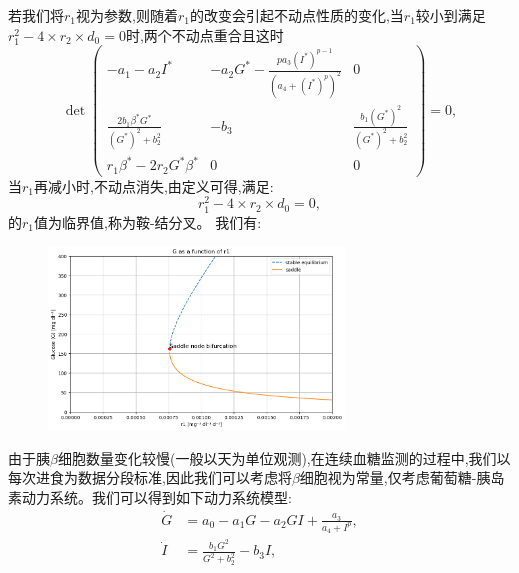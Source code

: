     若我们将$r_1$视为参数,则随着$r_1$的改变会引起不动点性质的变化,当$r_1$较小到满足$r_1^2-4\times r_2\times d_0=0$时,两个不动点重合且这时
    \begin{equation}
        \det \begin{pmatrix}
        -a_1-a_2I^*                            & -a_2G^*-\frac{pa_3(I^*)^{p-1}}{(a_4+(I^*)^p)^2} & 0                                  \\
        \frac{2b_1\beta^*G^*}{(G^*)^2 + b_2^2} & -b_3                                            & \frac{b_1(G^*)^2}{(G^*)^2 + b_2^2} \\
        r_1\beta^*-2r_2G^*\beta^*              & 0                                               & 0
    \end{pmatrix}=0,
    \end{equation}
    当$r_1$再减小时,不动点消失,由定义可得,满足:
    \begin{equation}
        r_1^2-4\times r_2\times d_0=0,
    \end{equation}
    的$r_1$值为临界值,称为鞍-结分叉。
我们有:

\begin{figure}[H]
    \centering
    \includegraphics[width=0.7\textwidth]{Img/betadynamic.png}
    \label{fig:bifurcation}
\end{figure}

由于胰$\beta$细胞数量变化较慢(一般以天为单位观测),在连续血糖监测的过程中,我们以每次进食为数据分段标准,因此我们可以考虑将$\beta$细胞视为常量,仅考虑葡萄糖-胰岛素动力系统\cite{huard2022mathematical}。我们可以得到如下动力系统模型:
\begin{equation}\label{11}
    \begin{aligned}
        \dot{G} & = a_0-a_1G-a_2GI+\frac{a_3}{a_4+I^p},  \\
        \dot{I} & = \frac{b_1 G^2}{G^2 + b_2^2} - b_3 I,
    \end{aligned}
\end{equation}

